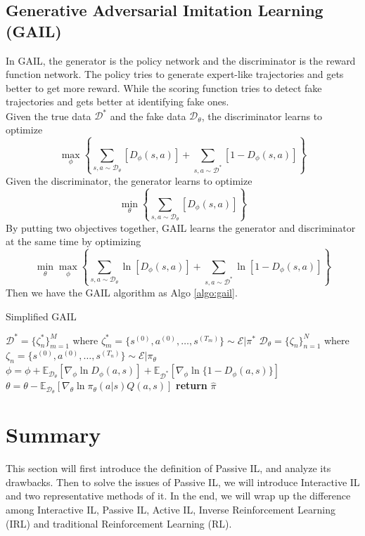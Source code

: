 \documentclass[11pt]{article}
\begin{document}
\subsection{Generative Adversarial Imitation Learning (GAIL)}
In GAIL, the generator is the policy network and the discriminator is the reward function network. The policy tries to generate
expert-like trajectories and gets better to get more reward. While the scoring function tries to detect fake trajectories and gets better at identifying fake ones. \\
Given the true data $\mathcal{D}^{*}$ and the fake data $\mathcal{D}_{\theta}$, the discriminator learns to optimize 
$$
\max _{\phi}\left\{\sum_{s, a \sim \mathcal{D}_{\theta}}\left[D_{\phi}(s, a)\right]+\sum_{s, a \sim \mathcal{D}^{*}}\left[1-D_{\phi}(s, a)\right]\right\}
$$
Given the discriminator, the generator learns to optimize 
$$\min _{\theta}\left\{\sum_{s, a \sim \mathcal{D}_{\theta}}\left[D_{\phi}(s, a)\right]\right\}$$
By putting two objectives together, GAIL learns the generator and discriminator at the same time by optimizing 
$$
\min _{\theta} \max _{\phi}\left\{\sum_{s, a \sim \mathcal{D}_{\theta}} \ln \left[D_{\phi}(s, a)\right]+\sum_{s, a \sim \mathcal{D}^{*}} \ln \left[1-D_{\phi}(s, a)\right]\right\}
$$
Then we have the GAIL algorithm as Algo \ref{algo:gail}. 

\begin{algorithm}[H]
\caption{Simplified GAIL}
\begin{algorithmic}[1]
\STATE  $\mathcal{D}^\ast = \{ \zeta^\ast_n\}_{m=1}^M$ where $\zeta_m^\ast = \{ s^{(0)}, a^{(0)}, \dots, s^{(T_m)} \} \sim \mathcal{E} | \pi^\ast$  
\STATE  $\mathcal{D}_\theta = \{ \zeta_n\}_{n=1}^N$ where $\zeta_n = \{s^{(0)}, a^{(0)}, \dots, s^{(T_n)} \} \sim \mathcal{E} | \pi_\theta$
\STATE  $\phi = \phi + \mathbb{E}_{\mathcal{D}_\theta} [\nabla_\phi \ln{D_\phi}(a, s)] + \mathbb{E}_{\mathcal{D}^\ast}[\nabla_\phi \ln \{1 - D_\phi(a, s)\}]$
\STATE  $\theta = \theta - \mathbb{E}_{\mathcal{D}_\theta}[\nabla_\theta \ln{\pi_\theta (a | s) Q(a, s)}]$
\ENDFOR
\STATE \textbf{return} $\hat{\pi}$
\end{algorithmic}
\label{algo:gail}
\end{algorithm}
\section{Summary}
This section will first introduce the definition of Passive IL, and analyze its drawbacks. Then to solve the issues of Passive IL, we will introduce Interactive IL and two representative methods of it. In the end, we will wrap up the difference among Interactive IL, Passive IL, Active IL, Inverse Reinforcement Learning (IRL) and traditional Reinforcement Learning (RL).
\end{document}
